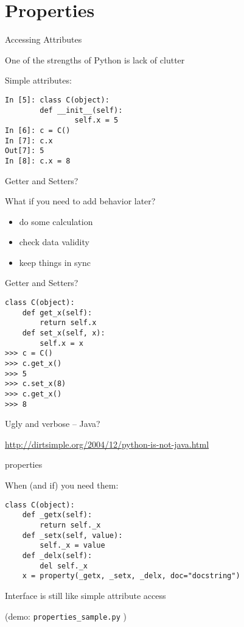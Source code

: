 \documentclass{beamer}
\begin{document}
\section{Properties}

\begin{frame}[fragile]{Accessing Attributes}

{\Large One of the strengths of Python is lack of clutter}

\vfill
{\Large Simple attributes:}

\begin{verbatim}
In [5]: class C(object):
        def __init__(self):
                self.x = 5
In [6]: c = C()
In [7]: c.x
Out[7]: 5
In [8]: c.x = 8
\end{verbatim}

\end{frame} 

\begin{frame}[fragile]{Getter and Setters?}

{\Large What if you need to add behavior later?}

\begin{itemize}
  \item do some calculation
  \item check data validity
  \item keep things in sync
\end{itemize}

\end{frame}


\begin{frame}[fragile]{Getter and Setters?}

\begin{verbatim}
class C(object):
    def get_x(self):
        return self.x
    def set_x(self, x):
        self.x = x
>>> c = C()
>>> c.get_x()
>>> 5
>>> c.set_x(8)
>>> c.get_x()
>>> 8
\end{verbatim}
{\Large Ugly and verbose -- Java?}

\url{http://dirtsimple.org/2004/12/python-is-not-java.html}

\end{frame} 

\begin{frame}[fragile]{properties}

{ \Large When (and if) you need them: }

\begin{verbatim}
class C(object):
    def _getx(self):
        return self._x
    def _setx(self, value):
        self._x = value
    def _delx(self):
        del self._x
    x = property(_getx, _setx, _delx, doc="docstring")
\end{verbatim}
{\Large Interface is still like simple attribute access}

\vfill
(demo: \verb|properties_sample.py| )
\end{frame} 
\end{document}
